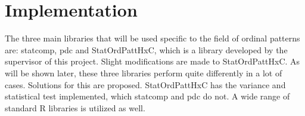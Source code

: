 \section{Implementation}
The three main libraries that will be used specific to the field of ordinal patterns are: statcomp\cite{statcomp}, pdc\cite{pdc} and StatOrdPattHxC, which is a library developed by the supervisor of this project. Slight modifications are made to StatOrdPattHxC. As will be shown later, these three libraries perform quite differently in a lot of cases. Solutions for this are proposed. StatOrdPattHxC has the variance and statistical test implemented, which statcomp and pdc do not. A wide range of standard R libraries is utilized as well.